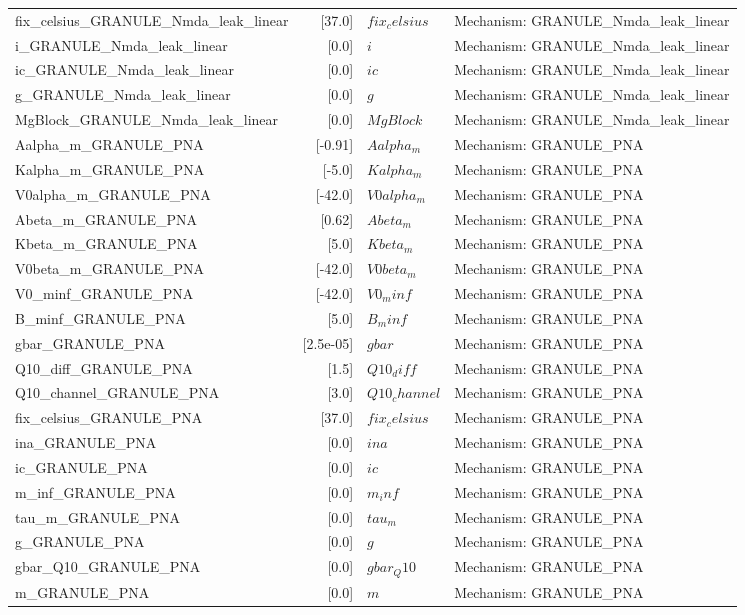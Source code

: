 \begin{tabular}{|l|r|l|l|}
fix_celsius_GRANULE_Nmda_leak_linear & [37.0] & $fix_celsius$ & Mechanism: GRANULE_Nmda_leak_linear \\
i_GRANULE_Nmda_leak_linear & [0.0] & $i$ & Mechanism: GRANULE_Nmda_leak_linear \\
ic_GRANULE_Nmda_leak_linear & [0.0] & $ic$ & Mechanism: GRANULE_Nmda_leak_linear \\
g_GRANULE_Nmda_leak_linear & [0.0] & $g$ & Mechanism: GRANULE_Nmda_leak_linear \\
MgBlock_GRANULE_Nmda_leak_linear & [0.0] & $MgBlock$ & Mechanism: GRANULE_Nmda_leak_linear \\
Aalpha_m_GRANULE_PNA & [-0.91] & $Aalpha_m$ & Mechanism: GRANULE_PNA \\
Kalpha_m_GRANULE_PNA & [-5.0] & $Kalpha_m$ & Mechanism: GRANULE_PNA \\
V0alpha_m_GRANULE_PNA & [-42.0] & $V0alpha_m$ & Mechanism: GRANULE_PNA \\
Abeta_m_GRANULE_PNA & [0.62] & $Abeta_m$ & Mechanism: GRANULE_PNA \\
Kbeta_m_GRANULE_PNA & [5.0] & $Kbeta_m$ & Mechanism: GRANULE_PNA \\
V0beta_m_GRANULE_PNA & [-42.0] & $V0beta_m$ & Mechanism: GRANULE_PNA \\
V0_minf_GRANULE_PNA & [-42.0] & $V0_minf$ & Mechanism: GRANULE_PNA \\
B_minf_GRANULE_PNA & [5.0] & $B_minf$ & Mechanism: GRANULE_PNA \\
gbar_GRANULE_PNA & [2.5e-05] & $gbar$ & Mechanism: GRANULE_PNA \\
Q10_diff_GRANULE_PNA & [1.5] & $Q10_diff$ & Mechanism: GRANULE_PNA \\
Q10_channel_GRANULE_PNA & [3.0] & $Q10_channel$ & Mechanism: GRANULE_PNA \\
fix_celsius_GRANULE_PNA & [37.0] & $fix_celsius$ & Mechanism: GRANULE_PNA \\
ina_GRANULE_PNA & [0.0] & $ina$ & Mechanism: GRANULE_PNA \\
ic_GRANULE_PNA & [0.0] & $ic$ & Mechanism: GRANULE_PNA \\
m_inf_GRANULE_PNA & [0.0] & $m_inf$ & Mechanism: GRANULE_PNA \\
tau_m_GRANULE_PNA & [0.0] & $tau_m$ & Mechanism: GRANULE_PNA \\
g_GRANULE_PNA & [0.0] & $g$ & Mechanism: GRANULE_PNA \\
gbar_Q10_GRANULE_PNA & [0.0] & $gbar_Q10$ & Mechanism: GRANULE_PNA \\
m_GRANULE_PNA & [0.0] & $m$ & Mechanism: GRANULE_PNA \\
\hline
\end{tabular}
